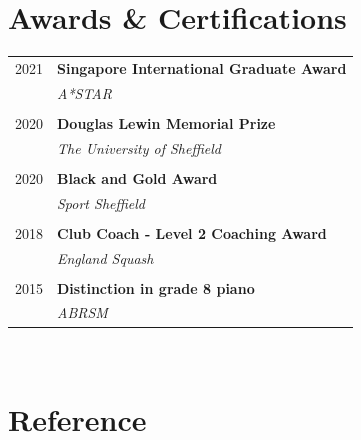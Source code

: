 \documentclass[10pt]{article} %
\begin{document}
\begin{changemargin}{0pt}{0.5pt}
\begin{minipage}[t]{0.44\textwidth}
\begin{changemargin}{5pt}{5pt}
\end{changemargin}


\section{Awards \& Certifications}

\begin{tabular}{rl}
	
	2021     & \textbf{Singapore International Graduate Award}\\ & \textit{A*STAR} \\ \\
	
	2020     & \textbf{Douglas Lewin Memorial Prize}\\ & \textit{The University of Sheffield} \\ \\
	
	2020	 & \textbf{Black and Gold Award}\\ & \textit{Sport Sheffield} \\ \\
	
	
	2018	 & \textbf{Club Coach - Level 2 Coaching Award}\\ & \textit{England Squash} \\ \\
	
	
	2015	 & \textbf{Distinction in grade 8 piano}\\ & \textit{ABRSM}
\end{tabular}\\[10pt]



\section{Reference}


\end{minipage}
\end{changemargin}
\end{document}

